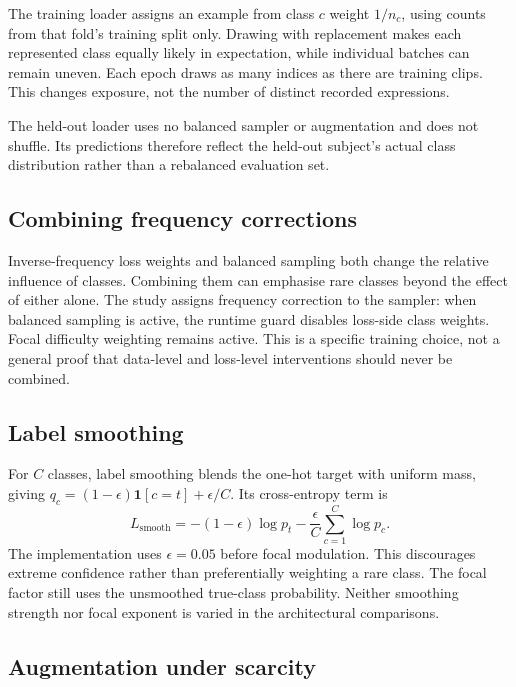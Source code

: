 The training loader assigns an example from class $c$ weight $1/n_c$, using counts from that fold's training split only. Drawing with replacement makes each represented class equally likely in expectation, while individual batches can remain uneven. Each epoch draws as many indices as there are training clips. This changes exposure, not the number of distinct recorded expressions.

The held-out loader uses no balanced sampler or augmentation and does not shuffle. Its predictions therefore reflect the held-out subject's actual class distribution rather than a rebalanced evaluation set.

\subsection{Combining frequency corrections}
\label{sec:combining-both}

Inverse-frequency loss weights and balanced sampling both change the relative influence of classes. Combining them can emphasise rare classes beyond the effect of either alone. The study assigns frequency correction to the sampler: when balanced sampling is active, the runtime guard disables loss-side class weights. Focal difficulty weighting remains active. This is a specific training choice, not a general proof that data-level and loss-level interventions should never be combined.

\subsection{Label smoothing}
\label{sec:label-smoothing}

For $C$ classes, label smoothing blends the one-hot target with uniform mass, giving $q_c=(1-\epsilon)\mathbf{1}[c=t]+\epsilon/C$. Its cross-entropy term is
\[
    L_{\mathrm{smooth}}
      =-(1-\epsilon)\log p_t
        -\frac{\epsilon}{C}\sum_{c=1}^{C}\log p_c.
\]
The implementation uses $\epsilon=0.05$ before focal modulation. This discourages extreme confidence rather than preferentially weighting a rare class. The focal factor still uses the unsmoothed true-class probability. Neither smoothing strength nor focal exponent is varied in the architectural comparisons.

\subsection{Augmentation under scarcity}
\label{sec:augmentation}

